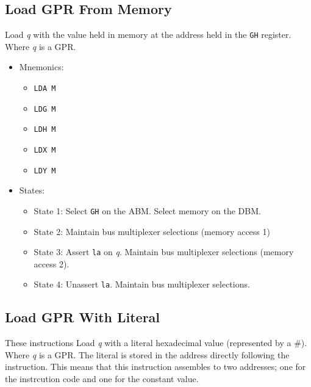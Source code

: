 \documentclass[a4paper,12pt]{article}
\newcommand{\Gr}{\texttt{G}}
\newcommand{\Hr}{\texttt{H}}
\newcommand{\qq}{\textit{q}}
\begin{document}
\subsection{Load GPR From Memory}
Load \qq{} with the value held in memory at the address held in the \Gr{}\Hr{}
register. Where \qq{} is a GPR.
\par

\begin{itemize}
\item Mnemonics:
\begin{itemize}
	\item \texttt{LDA M}
	\item \texttt{LDG M}
	\item \texttt{LDH M}
	\item \texttt{LDX M}
	\item \texttt{LDY M}
\end{itemize}
\item States:
\begin{itemize}
	\item State 1: Select \Gr{}\Hr{} on the ABM. Select memory on the DBM.
	\item State 2: Maintain bus multiplexer selections (memory access 1)
	\item State 3: Assert \texttt{la} on \qq{}. Maintain bus multiplexer
	selections (memory access 2).
	\item State 4: Unassert \texttt{la}. Maintain bus multiplexer 
	selections.
\end{itemize}
\end{itemize}

\subsection{Load GPR With Literal}
These instructions Load \qq{} with a literal hexadecimal value (represented by
a \#). Where \qq{} is a GPR. The literal is stored in the address directly 
following the instruction. This means that this instruction assembles to two
addresses; one for the instrcution code and one for the constant value.
\par
\end{document}
